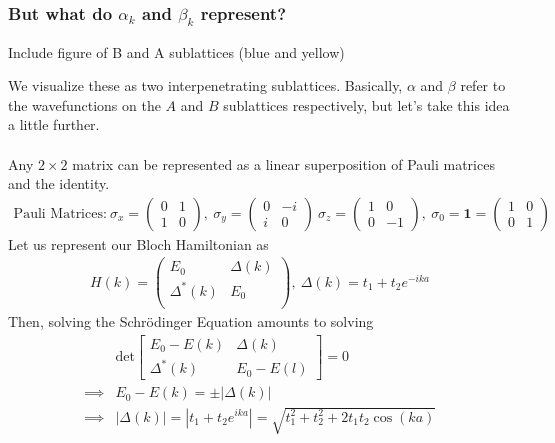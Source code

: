 \documentclass[11pt]{article}
\begin{document}
\subsubsection*{But what do $\alpha_k$ and $\beta_k$ represent?} 
\vskip 0.5cm
\begin{center}
  Include figure of B and A sublattices (blue and yellow)
\end{center} We visualize these as two interpenetrating sublattices. Basically, $\alpha$ and $\beta$ refer to the wavefunctions on the $A$ and $B$ sublattices respectively, but let's take this idea a little further.
\\
\\
Any $2 \times 2$ matrix can be represented as a linear superposition of Pauli matrices and the identity. 
\begin{align*}
  \text{Pauli Matrices:} ~ \sigma_x = \begin{pmatrix}
    0 & 1 \\
    1 & 0
  \end{pmatrix}, ~ \sigma_y = \begin{pmatrix}
    0 & -i \\
    i & 0
  \end{pmatrix}  ~ \sigma_z = \begin{pmatrix}
    1 & 0 \\
    0 & -1
  \end{pmatrix},  ~ \sigma_0 = \mathbf{1} = \begin{pmatrix}
    1 & 0 \\
    0 & 1
  \end{pmatrix}
\end{align*} Let us represent our Bloch Hamiltonian as 
\begin{align*}
  H(k) = \begin{pmatrix}
    E_0 & \Delta(k) \\
    \Delta^*(k) & E_0 \\
  \end{pmatrix}, ~ \Delta(k) = t_1 + t_2 e^{-ika}
\end{align*} Then, solving the Schr\"odinger Equation amounts to solving 
\begin{align*}
  &\mathrm{det} \begin{bmatrix}
    E_0 - E(k) & \Delta(k) \\
    \Delta^*(k) & E_0 - E(l)
  \end{bmatrix} = 0 \\
  \implies& E_0 - E(k) = \pm \left| \Delta(k) \right| \\
  \implies& \left| \Delta(k) \right| = \left| t_1 + t_2 e^{ika} \right| = \sqrt{t_1^2 + t_2^2 + 2t_1t_2 \cos(ka)}
\end{align*} 
\end{document}
